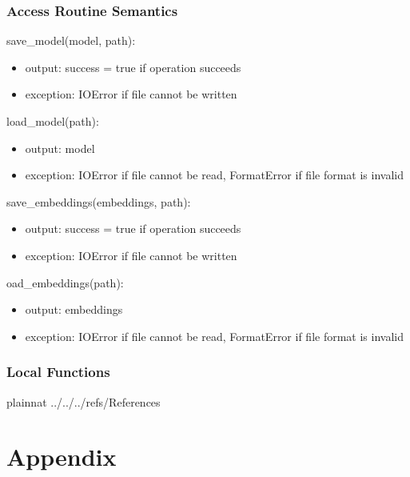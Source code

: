 \documentclass[12pt, titlepage]{article}
\begin{document}
\subsubsection{Access Routine Semantics}

\noindent save\_model(model, path):
\begin{itemize}
\item output:  success = true if operation succeeds
\item exception: IOError if file cannot be written
\end{itemize}

\noindent load\_model(path):
\begin{itemize}
\item output: model
\item exception: IOError if file cannot be read, FormatError if file format is invalid
\end{itemize}

\noindent save\_embeddings(embeddings, path):
\begin{itemize}
\item output: success = true if operation succeeds
\item exception: IOError if file cannot be written
\end{itemize}

\noindent oad\_embeddings(path):
\begin{itemize}
\item output: embeddings
\item exception: IOError if file cannot be read, FormatError if file format is invalid
\end{itemize}



\subsubsection{Local Functions}

 

\newpage

 {plainnat}
 {../../../refs/References}

\newpage

\section{Appendix} \label{Appendix}
\end{document}

